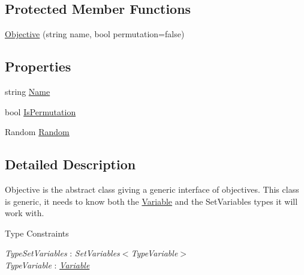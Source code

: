 \subsection*{Protected Member Functions}
\begin{DoxyCompactItemize}
\item 
\hyperlink{classghost_1_1Objective_3_01TypeSetVariables_00_01TypeVariable_01_4_a036b0e1d3b3678f38f5080a1a32e27f4}{Objective} (string name, bool permutation=false)
\end{DoxyCompactItemize}
\subsection*{Properties}
\begin{DoxyCompactItemize}
\item 
string \hyperlink{classghost_1_1Objective_3_01TypeSetVariables_00_01TypeVariable_01_4_a7613aecfe171eb9aa6f3b77ccdbe49be}{Name}
\item 
bool \hyperlink{classghost_1_1Objective_3_01TypeSetVariables_00_01TypeVariable_01_4_ae27cf3769e4705f74e22a32604982375}{Is\-Permutation}
\item 
Random \hyperlink{classghost_1_1Objective_3_01TypeSetVariables_00_01TypeVariable_01_4_ad1ab2a8ba444cebdf8a9e7ee692731b4}{Random}
\end{DoxyCompactItemize}


\subsection{Detailed Description}
Objective is the abstract class giving a generic interface of objectives. This class is generic, it needs to know both the \hyperlink{classghost_1_1Variable}{Variable} and the Set\-Variables types it will work with. \begin{Desc}
\item[Type Constraints]\begin{description}
\item[{\em Type\-Set\-Variables} : {\em Set\-Variables$<$Type\-Variable$>$}]\item[{\em Type\-Variable} : {\em \hyperlink{classghost_1_1Variable}{Variable}}]\end{description}
\end{Desc}


